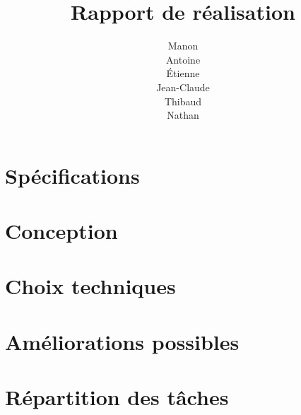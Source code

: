 \documentclass[12pt,titlepage,a4paper]{report}
\title{Rapport de réalisation}
\author{Manon \bsc{Ansart}\\ Antoine \bsc{Augusti}\\ Étienne \bsc{Batise}\\ Jean-Claude \bsc{Bernard}\\ Thibaud \bsc{Dauce}\\ Nathan \bsc{Malo}}
\begin{document}

	\tableofcontents

	\chapter{Spécifications}
		

	\chapter{Conception}
		

	\chapter{Choix techniques}
		

	\chapter{Améliorations possibles}
		

	\chapter{Répartition des tâches}
		
\end{document}
